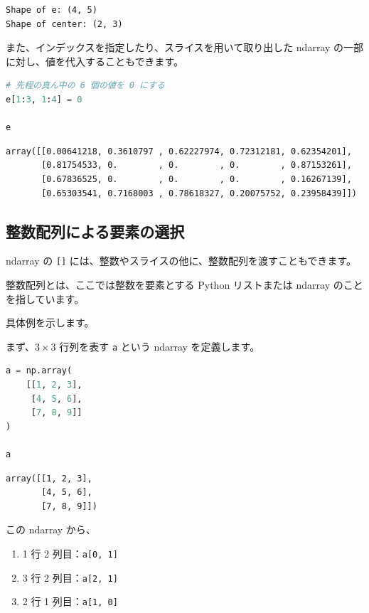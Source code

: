 \begin{lstlisting}[style=outputcell]
Shape of e: (4, 5)
Shape of center: (2, 3)
\end{lstlisting}

また、インデックスを指定したり、スライスを用いて取り出した ndarray の一部に対し、値を代入することもできます。


\begin{lstlisting}[style=codecell,language=Python]
# 先程の真ん中の 6 個の値を 0 にする
e[1:3, 1:4] = 0

e
\end{lstlisting}

\begin{lstlisting}[style=outputcell]
array([[0.00641218, 0.3610797 , 0.62227974, 0.72312181, 0.62354201],
       [0.81754533, 0.        , 0.        , 0.        , 0.87153261],
       [0.67836525, 0.        , 0.        , 0.        , 0.16267139],
       [0.65303541, 0.7168003 , 0.78618327, 0.20075752, 0.23958439]])
\end{lstlisting}

\subsection{整数配列による要素の選択}


ndarray の \texttt{[]} には、整数やスライスの他に、整数配列を渡すこともできます。

整数配列とは、ここでは整数を要素とする Python リストまたは ndarray のことを指しています。


具体例を示します。

まず、$3 \times 3$ 行列を表す \texttt{a} という ndarray を定義します。


\begin{lstlisting}[style=codecell,language=Python]
a = np.array(
    [[1, 2, 3],
     [4, 5, 6],
     [7, 8, 9]]
)

a
\end{lstlisting}

\begin{lstlisting}[style=outputcell]
array([[1, 2, 3],
       [4, 5, 6],
       [7, 8, 9]])
\end{lstlisting}

この ndarray から、


\begin{enumerate}
\item 1 行 2 列目：\texttt{a[0, 1]}
\item 3 行 2 列目：\texttt{a[2, 1]}
\item 2 行 1 列目：\texttt{a[1, 0]}
\end{enumerate}


